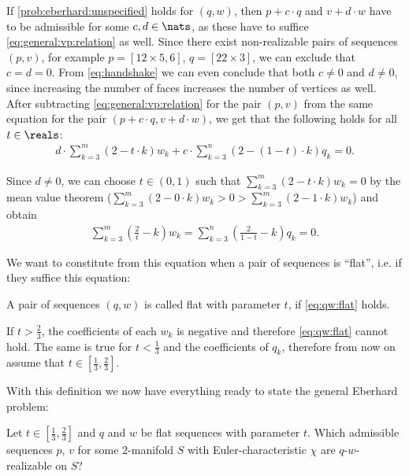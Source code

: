 If \autoref{prob:eberhard:unspecified} holds for $(q, w)$, then $p + c \cdot q$ and $v + d \cdot w$ have to be admissible for some $c,d \in \nats$, as these have to suffice \eqref{eq:general:vp:relation} as well. Since there exist non-realizable pairs of sequences $(p, v)$, for example $p = [12 \times 5, 6]$, $q = [22 \times 3]$, we can exclude that $c = d = 0$. From \eqref{eq:handshake} we can even conclude that both $c \neq 0$ and $d \neq 0$, since increasing the number of faces increases the number of vertices as well. After subtracting \eqref{eq:general:vp:relation} for the pair $(p, v)$ from the same equation for the pair $(p + c \cdot q, v + d \cdot w)$, we get that the following holds for all $t \in \reals$:
\begin{align*}
  d \cdot \sum_{k=3}^m \left(2 - t \cdot k \right) w_k + c \cdot \sum_{k=3}^n \left( 2 - (1 - t) \cdot k \right) q_k = 0. 
\end{align*}

Since $d \neq 0$, we can choose $t \in (0, 1)$ such that $\sum_{k=3}^m (2 - t \cdot k) w_k = 0$ by the mean value theorem ($\sum_{k=3}^m (2 - 0 \cdot k) w_k > 0 > \sum_{k=3}^m (2 - 1 \cdot k) w_k$) and obtain
\begin{align}
    \sum_{k=3}^m \left(\frac{2}{t} - k \right) w_k = \sum_{k=3}^n \left( \frac{2}{1-t} - k \right) q_k = 0. \label{eq:qw:flat}
\end{align}

We want to constitute from this equation when a pair of sequences is ``flat'', i.e. if they suffice this equation:

\begin{definition}
  A pair of sequences $(q, w)$ is called flat with parameter $t$, if \eqref{eq:qw:flat} holds.
\end{definition}

If $t > \frac{2}{3}$, the coefficients of each $w_k$ is negative and therefore \eqref{eq:qw:flat} cannot hold. The same is true for $t < \frac{1}{3}$ and the coefficients of $q_k$, therefore from now on assume that $t \in \left[\frac{1}{3}, \frac{2}{3}\right]$.

With this definition we now have everything ready to state the general {\sc Eberhard} problem:

\begin{problem}\label{problem:eberhard}
  Let $ t \in \left[\frac{1}{3}, \frac{2}{3}\right]$ and $q$ and $w$ be flat sequences with parameter $t$. Which admissible sequences $p$, $v$ for some $2$-manifold $S$ with {\sc Euler}-characteristic $\chi$ are $q$-$w$-realizable on $S$?
\end{problem}

